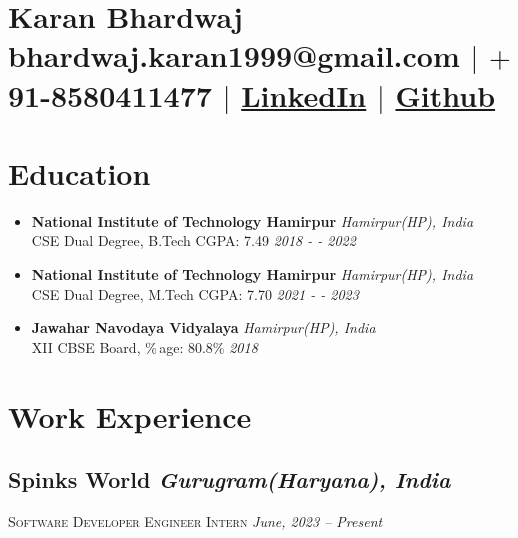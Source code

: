 \documentclass[10pt]{article}
\begin{document}
\section{\Huge{Karan Bhardwaj}\\ \large \normalfont bhardwaj.karan1999@gmail.com $|$ \normalfont $+$91-8580411477 $|$  \href{https://www.linkedin.com/in/karan-bhardwaj-994157184}{LinkedIn} $|$ \href{https://github.com/karanbhardwaj81}{Github}}

\section{Education}
\begin{itemize}
  \item{
      \textbf{National Institute of Technology Hamirpur} \hfill \textit{Hamirpur(HP), India}\\
      CSE Dual Degree, B.Tech CGPA: 7.49 \hfill \textit{2018 - - 2022}
  } 
   \item{
      \textbf{National Institute of Technology Hamirpur} \hfill \textit{Hamirpur(HP), India}\\
      CSE Dual Degree, M.Tech CGPA: 7.70 \hfill \textit{2021 - - 2023}
  } 
  \item{
      \textbf{Jawahar Navodaya Vidyalaya} \hfill \textit{Hamirpur(HP), India}\\
      XII CBSE Board, \%\,age: 80.8\% \hfill \textit{2018}
  }
\end{itemize}


\section{Work Experience}
\subsection*{ Spinks World \hfill \normalsize \normalfont \textit{Gurugram(Haryana), India}}

\vspace{-1ex}
\textsc{\textmd{Software Developer Engineer Intern}} \hfill \normalsize \textit{June, 2023 -- Present}
\vspace{-1ex}
\end{document}
